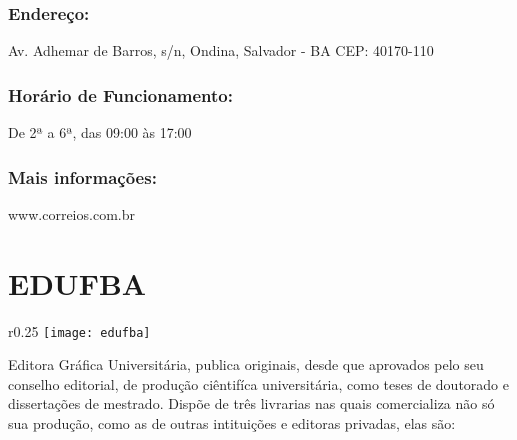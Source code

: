        \subsubsection{Endereço:}
            Av. Adhemar de Barros, s/n, Ondina, Salvador - BA 
            CEP: 40170-110
            
        \subsubsection{Horário de Funcionamento:}
            De 2ª a 6ª, das 09:00 às 17:00

        \subsubsection{Mais informações:}
            www.correios.com.br
            
\section{EDUFBA}
    \begin{wrapfigure}{r}{0.25\textwidth}
        \centering
        \texttt{[image: edufba]}
    \end{wrapfigure}
   
    Editora Gráfica Universitária, publica originais, desde que aprovados pelo seu conselho editorial, de produção ciêntifíca universitária, como teses de doutorado e dissertações de mestrado. Dispõe de três livrarias nas quais comercializa não só sua produção, como as de outras intituições e editoras privadas, elas são: \\
    
